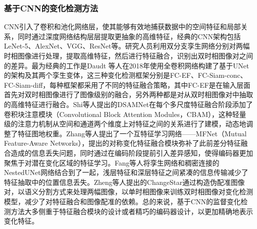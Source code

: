 \documentclass[lang=chs, degree=master, blindreview=false, adobe=false]{yanputhesis}
\begin{document}
\subsubsection{基于CNN的变化检测方法}
CNN引入了卷积和池化网络层，使其能够有效地捕获数据中的空间特征和局部关系，同时通过深度网络结构层层提取更抽象的高维特征，经典的CNN架构包括LeNet-5、AlexNet、VGG、ResNet等。研究人员利用双分支孪生网络分别对两幅时相图像进行处理，提取高维特征，然后进行特征融合，识别出双时相图像对之间的差异。最为经典的工作是Daudt 等人\cite{daudt2018FC-EF}在2018年使用全卷积网络构建了基于UNet的架构及其两个孪生变体，这三种变化检测框架分别是FC-EF、FC-Siam-conc、FC-Siam-diff，每种框架都采用了不同的特征融合策略，其中FC-EF是在输入层面首先对双时相图像进行了图像级别的融合，另外两种都是对从双时相图像对中抽取的高维特征进行融合。Shi等人\cite{shi2021DSAMNet}提出的DSAMNet在每个多尺度特征融合阶段添加了卷积块注意模块（Convolutional Block Attention Modules，CBAM），这种轻量级的注意力机制从空间和通道两个维度上对特征之间的关系进行了建模，动态地调整了特征图地权重。Zhang等人\cite{zhang2023MFNet}提出了一个互特征学习网络——MFNet（Mutual Feature-Aware Networks），提出的对称变化特征融合模块弥补了此前差分特征融合造成的信息丢失问题，同时通过在编码阶段提前引入差异感知，使得编码器更加聚焦于对潜在变化区域的特征学习。Fang等人\cite{fang2021SNUNet}将孪生网络和稠密连接的NestedUNet网络结合到了一起，浅层特征和深层特征之间紧凑的信息传输减少了特征抽取中的位置信息丢失。Zheng等人提出的ChangeStar\cite{zheng2021changestar}通过构造伪配准图像对，以语义分割方式来处理两幅图像，以单时相图像来训练双时相图像对变化检测模型，减少了对特征融合和图像配准的依赖。总的来说，基于CNN的监督变化检测方法大多侧重于特征融合模块的设计或者精巧的编码器设计，以更加精确地表示变化特征。
\end{document}
